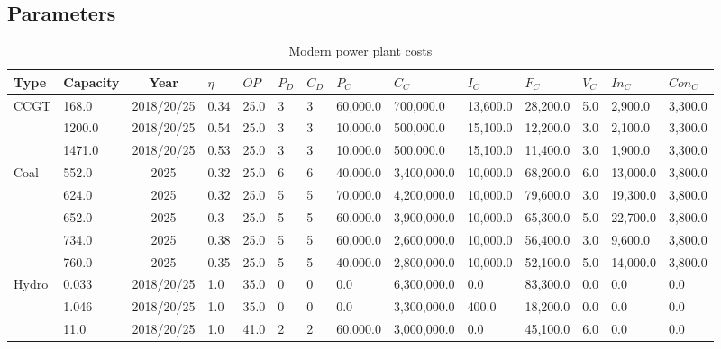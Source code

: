 

\subsection{Parameters}



\begin{table*}[]
	\caption{Modern power plant costs \cite{Department2016}}
	\begin{tabularx}{\linewidth}{|p{}|l|c|l|l|l|l|l|l|l|l|l|l|l|}
\hline
Type & Capacity & Year & $\eta$ & $OP$ & $P_D$ & $C_D$ & $P_C$ & $C_C$ & $I_C$ & $F_C$ & $V_C$ & $In_C$ & $Con_C$ \\ \hline
\multirow{3}{*}{CCGT} & 168.0 & 2018/20/25 & 0.34 & 25.0 & 3 & 3 & 60,000.0 & 700,000.0 & 13,600.0 & 28,200.0 & 5.0 & 2,900.0 & 3,300.0 \\ \cline{2-14} 
& 1200.0 & 2018/20/25 & 0.54 & 25.0 & 3 & 3 & 10,000.0 & 500,000.0 & 15,100.0 & 12,200.0 & 3.0 & 2,100.0 & 3,300.0 \\ \cline{2-14} 
& 1471.0 & 2018/20/25 & 0.53 & 25.0 & 3 & 3 & 10,000.0 & 500,000.0 & 15,100.0 & 11,400.0 & 3.0 & 1,900.0 & 3,300.0 \\ \hline
\multirow{5}{*}{Coal} & 552.0 & 2025 & 0.32 & 25.0 & 6 & 6 & 40,000.0 & 3,400,000.0 & 10,000.0 & 68,200.0 & 6.0 & 13,000.0 & 3,800.0 \\ \cline{2-14} 
& 624.0 & 2025 & 0.32 & 25.0 & 5 & 5 & 70,000.0 & 4,200,000.0 & 10,000.0 & 79,600.0 & 3.0 & 19,300.0 & 3,800.0 \\ \cline{2-14} 
& 652.0 & 2025 & 0.3 & 25.0 & 5 & 5 & 60,000.0 & 3,900,000.0 & 10,000.0 & 65,300.0 & 5.0 & 22,700.0 & 3,800.0 \\ \cline{2-14} 
& 734.0 & 2025 & 0.38 & 25.0 & 5 & 5 & 60,000.0 & 2,600,000.0 & 10,000.0 & 56,400.0 & 3.0 & 9,600.0 & 3,800.0 \\ \cline{2-14} 
& 760.0 & 2025 & 0.35 & 25.0 & 5 & 5 & 40,000.0 & 2,800,000.0 & 10,000.0 & 52,100.0 & 5.0 & 14,000.0 & 3,800.0 \\ \hline
\multirow{3}{*}{Hydro} & 0.033 & 2018/20/25 & 1.0 & 35.0 & 0 & 0 & 0.0 & 6,300,000.0 & 0.0 & 83,300.0 & 0.0 & 0.0 & 0.0 \\ \cline{2-14} 
& 1.046 & 2018/20/25 & 1.0 & 35.0 & 0 & 0 & 0.0 & 3,300,000.0 & 400.0 & 18,200.0 & 0.0 & 0.0 & 0.0 \\ \cline{2-14} 
& 11.0 & 2018/20/25 & 1.0 & 41.0 & 2 & 2 & 60,000.0 & 3,000,000.0 & 0.0 & 45,100.0 & 6.0 & 0.0 & 0.0 \\ \hline

\end{tabularx}
\end{table*}
